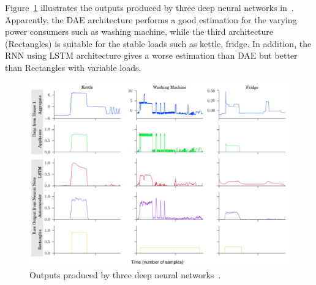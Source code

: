 Figure~\ref{fig:AA4} illustrates the outputs produced by three deep neural networks in~\cite{KellyK15}. Apparently, the DAE architecture performs a good estimation for the varying power consumers such as washing machine, while the third architecture (Rectangles) is suitable for the stable loads such as kettle, fridge. In addition, the RNN using LSTM architecture gives a worse estimation than DAE but better than Rectangles with variable loads.

\begin{figure}
\centering
\includegraphics[width=1\textwidth]{./chapters/chapter2/images/neuralNILM.pdf} 
\caption{Outputs produced by three deep neural networks~\cite{KellyK15}.} 
\label{fig:AA4} 
\end{figure}

